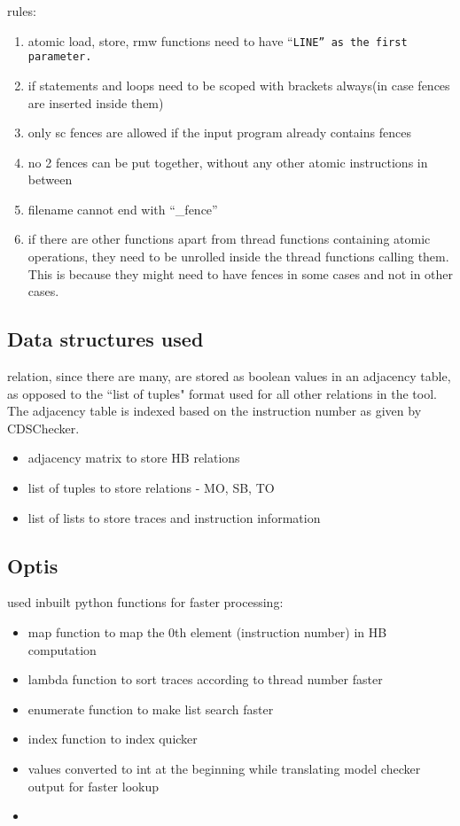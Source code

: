 rules:
\begin{enumerate}
	\item atomic load, store, rmw functions need to have ``\tt{\textunderscore\textunderscore LINE\textunderscore\textunderscore}'' as the first parameter.
	\item if statements and loops need to be scoped with brackets always(in case fences are inserted inside them)
	\item only sc fences are allowed if the input program already contains fences
	\item no 2 fences can be put together, without any other atomic instructions in between
	\item filename cannot end with ``\_fence''
	\item if there are other functions apart from thread functions containing atomic operations, they need to be unrolled inside the thread functions calling them. This is because they might need to have fences in some cases and not in other cases.
\end{enumerate}

\subsection{Data structures used}
\setHB relation, since there are many, are stored as boolean values in 
an adjacency table, as opposed to the ``list of tuples" format used for 
all other relations in the tool. The adjacency table is indexed based 
on the instruction number as given by CDSChecker. 

\begin{itemize}
	\item adjacency matrix to store HB relations
	\item list of tuples to store relations - MO, SB, TO
	\item list of lists to store traces and instruction information
\end{itemize}

\subsection{Optis}
used inbuilt python functions for faster processing:
\begin{itemize}
	\item map function to map the 0th element (instruction number) in HB computation
	\item lambda function to sort traces according to thread number faster
	\item enumerate function to make list search faster
	\item index function to index quicker
	\item values converted to int at the beginning while translating model checker output for faster lookup
	\item 
\end{itemize}

